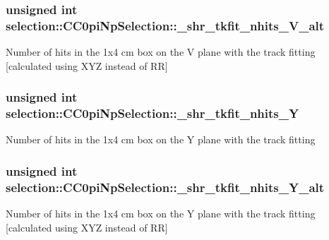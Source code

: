 \subsubsection[{\texorpdfstring{\+\_\+shr\+\_\+tkfit\+\_\+nhits\+\_\+\+V\+\_\+alt}{_shr_tkfit_nhits_V_alt}}]{\setlength{\rightskip}{0pt plus 5cm}unsigned int selection\+::\+C\+C0pi\+Np\+Selection\+::\+\_\+shr\+\_\+tkfit\+\_\+nhits\+\_\+\+V\+\_\+alt\hspace{0.3cm}{\ttfamily [private]}}\hypertarget{classselection_1_1CC0piNpSelection_abd57bba0cf3b1c9268afc03e8713df13}{}\label{classselection_1_1CC0piNpSelection_abd57bba0cf3b1c9268afc03e8713df13}
Number of hits in the 1x4 cm box on the V plane with the track fitting \mbox{[}calculated using X\+YZ instead of RR\mbox{]} 
\subsubsection[{\texorpdfstring{\+\_\+shr\+\_\+tkfit\+\_\+nhits\+\_\+Y}{_shr_tkfit_nhits_Y}}]{\setlength{\rightskip}{0pt plus 5cm}unsigned int selection\+::\+C\+C0pi\+Np\+Selection\+::\+\_\+shr\+\_\+tkfit\+\_\+nhits\+\_\+Y\hspace{0.3cm}{\ttfamily [private]}}\hypertarget{classselection_1_1CC0piNpSelection_ae3a53326b19594013c9df08b66ccaa73}{}\label{classselection_1_1CC0piNpSelection_ae3a53326b19594013c9df08b66ccaa73}
Number of hits in the 1x4 cm box on the Y plane with the track fitting 
\subsubsection[{\texorpdfstring{\+\_\+shr\+\_\+tkfit\+\_\+nhits\+\_\+\+Y\+\_\+alt}{_shr_tkfit_nhits_Y_alt}}]{\setlength{\rightskip}{0pt plus 5cm}unsigned int selection\+::\+C\+C0pi\+Np\+Selection\+::\+\_\+shr\+\_\+tkfit\+\_\+nhits\+\_\+\+Y\+\_\+alt\hspace{0.3cm}{\ttfamily [private]}}\hypertarget{classselection_1_1CC0piNpSelection_ae147f3006253b7689636993c76221f21}{}\label{classselection_1_1CC0piNpSelection_ae147f3006253b7689636993c76221f21}
Number of hits in the 1x4 cm box on the Y plane with the track fitting \mbox{[}calculated using X\+YZ instead of RR\mbox{]} 
